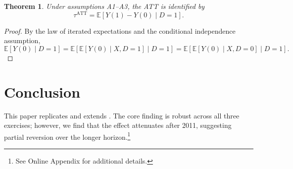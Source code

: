 \documentclass{article}
\newcommand{\E}{\mathbb{E}}
\newtheorem{theorem}{Theorem}
\begin{document}
\begin{theorem}
Under assumptions A1--A3, the ATT is identified by
\[
  \tau^{\mathrm{ATT}} = \E\!\left[Y(1) - Y(0) \mid D = 1\right].
\]
\end{theorem}

\begin{proof}
By the law of iterated expectations and the conditional independence assumption,
\[
  \E\!\left[Y(0) \mid D = 1\right]
  = \E\!\left[\E\!\left[Y(0) \mid X, D = 1\right] \mid D = 1\right]
  = \E\!\left[\E\!\left[Y(0) \mid X, D = 0\right] \mid D = 1\right].
\]
\end{proof}

\section{Conclusion}
This paper replicates and extends \cite{bohn2014did}. The core finding is robust across all three exercises; however, we find that the effect attenuates after 2011, suggesting partial reversion over the longer horizon.\footnote{See Online Appendix for additional details.}
\end{document}
